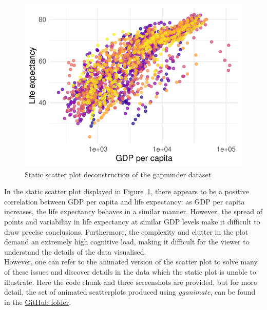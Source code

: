 \documentclass{article}\usepackage[]{graphicx}\usepackage[]{xcolor}
\makeatletter
\def\maxwidth{ %
  \ifdim\Gin@nat@width>\linewidth
    \linewidth
  \else
    \Gin@nat@width
  \fi
}
\newenvironment{knitrout}{}{} %
\numberwithin{equation}{section}
\makeatother
\begin{document}
\begin{knitrout}\scriptsize
{}\color{fgcolor}\begin{figure}[H]

{\centering \includegraphics[width=\maxwidth]{figure/beamer-gapminder_static-1} 

}

\caption[Static scatter plot deconstruction of the gapminder dataset]{Static scatter plot deconstruction of the gapminder dataset}\label{fig:gapminder_static}
\end{figure}

\end{knitrout}

\noindent
In the static scatter plot displayed in Figure~\ref{fig:gapminder_static}, there appears to be a positive correlation between GDP per capita and life expectancy: as GDP per capita increases, the life expectancy behaves in a similar manner. However, the spread of points and variability in life expectancy at similar GDP levels make it difficult to draw precise conclusions. Furthermore, the complexity and clutter in the plot demand an extremely high cognitive load, making it difficult for the viewer to understand the details of the data visualised.\\ 

\noindent
However, one can refer to the animated version of the scatter plot to solve many of these issues and discover details in the data which the static plot is unable to illustrate. Here the code chunk and three screenshots are provided, but for more detail, the set of animated scatterplots produced using \textit{gganimate}, can be found in the \href{https://github.com/Qinqing-Li/Data-Visualisation-Project/tree/main/code}{GitHub folder}. \\
\end{document}
